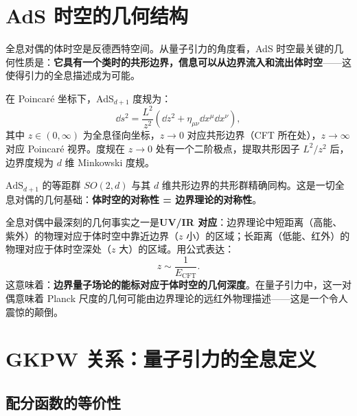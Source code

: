 \section{AdS 时空的几何结构}

全息对偶的体时空是反德西特空间。从量子引力的角度看，AdS 时空最关键的几何性质是：\textbf{它具有一个类时的共形边界，信息可以从边界流入和流出体时空}——这使得引力的全息描述成为可能。

\begin{definition}
    在 Poincaré 坐标下，AdS$_{d+1}$ 度规为：
    \begin{equation}
        \boxed{\dd s^2 = \frac{L^2}{z^2}\left(\dd z^2 + \eta_{\mu\nu}\dd x^\mu \dd x^\nu\right)},
    \end{equation}
    其中 $z \in (0,\infty)$ 为全息径向坐标，$z \to 0$ 对应共形边界（CFT 所在处），$z \to \infty$ 对应 Poincaré 视界。度规在 $z \to 0$ 处有一个二阶极点，提取共形因子 $L^2/z^2$ 后，边界度规为 $d$ 维 Minkowski 度规。
\end{definition}

\begin{theorem}
    $\mathrm{AdS}_{d+1}$ 的等距群 $SO(2,d)$ 与其 $d$ 维共形边界的共形群精确同构。这是一切全息对偶的几何基础：\textbf{体时空的对称性 = 边界理论的对称性}。
\end{theorem}

\begin{remark}
    全息对偶中最深刻的几何事实之一是\textbf{UV/IR 对应}：边界理论中短距离（高能、紫外）的物理对应于体时空中靠近边界（$z$ 小）的区域；长距离（低能、红外）的物理对应于体时空深处（$z$ 大）的区域。用公式表达：
    \begin{equation}
        z \sim \frac{1}{E_{\text{CFT}}}.
    \end{equation}
    这意味着：\textbf{边界量子场论的能标对应于体时空的几何深度}。在量子引力中，这一对偶意味着 Planck 尺度的几何可能由边界理论的远红外物理描述——这是一个令人震惊的颠倒。
\end{remark}

\section{GKPW 关系：量子引力的全息定义}

\subsection{配分函数的等价性}

